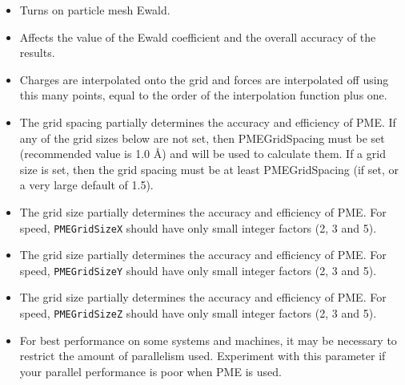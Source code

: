 \begin{itemize}

\item
{}
{Turns on particle mesh Ewald.}

\item
{}
{Affects the value of the Ewald coefficient and the overall accuracy of the results.}

\item
{}
{Charges are interpolated onto the grid and forces are interpolated off using this many points, equal to the order of the interpolation function plus one.}

\item
{}
{The grid spacing partially determines the accuracy and efficiency of PME.
If any of the grid sizes below are not set, then PMEGridSpacing must be set
(recommended value is 1.0 \AA ) and will be used to calculate them.
If a grid size is set, then the grid spacing must be
at least PMEGridSpacing (if set, or a very large default of 1.5).}

\item
{}
{The grid size partially determines the accuracy and efficiency of PME.
For speed, {\tt PMEGridSizeX} should have only small integer factors (2, 3 and 5).}

\item
{}
{The grid size partially determines the accuracy and efficiency of PME.
For speed, {\tt PMEGridSizeY} should have only small integer factors (2, 3 and 5).}

\item
{}
{The grid size partially determines the accuracy and efficiency of PME.
For speed, {\tt PMEGridSizeZ} should have only small integer factors (2, 3 and 5).}

\item
{}
{For best performance on some systems and machines, it may be necessary to
restrict the amount of parallelism used.  Experiment with this parameter if
your parallel performance is poor when PME is used.}


\end{itemize}
